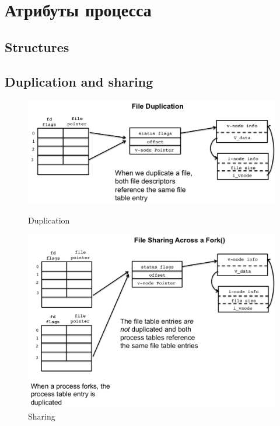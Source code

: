 \documentclass[../../lectures.tex]{subfiles}
\begin{document}
\section{Атрибуты процесса}
\subsection{Structures}

\subsection{Duplication and sharing}
\begin{figure}[H]
\begin{minipage}[c]{0.5\linewidth}
\centering
\includegraphics[width=\textwidth]{images/dup.png}
\caption{Duplication}
\end{minipage}
\hspace{0.5cm}
\begin{minipage}[c]{0.5\linewidth}
\includegraphics[width=\textwidth]{images/file-sharing.png}
\caption{Sharing}
\end{minipage}
\end{figure}
\end{document}
